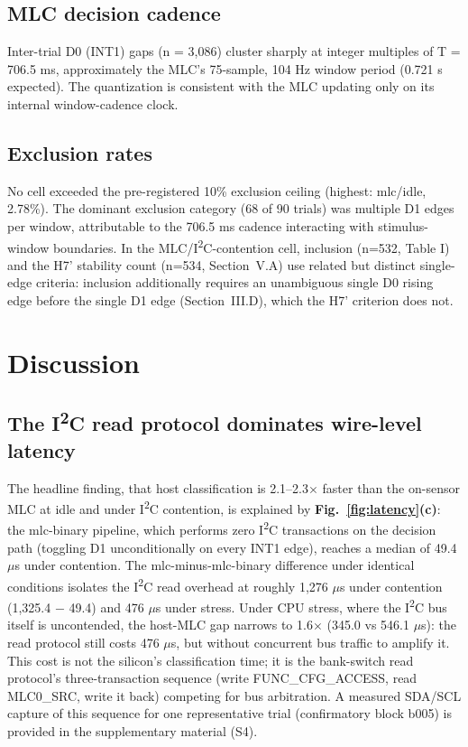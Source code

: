 \subsection{MLC decision cadence}

Inter-trial D0 (INT1) gaps (n = 3,086) cluster sharply at integer multiples of T = 706.5 ms, approximately the MLC's 75-sample, 104 Hz window period (0.721 s expected). The quantization is consistent with the MLC updating only on its internal window-cadence clock.

\subsection{Exclusion rates}

No cell exceeded the pre-registered 10\% exclusion ceiling (highest: mlc/idle, 2.78\%). The dominant exclusion category (68 of 90 trials) was multiple D1 edges per window, attributable to the 706.5 ms cadence interacting with stimulus-window boundaries. In the MLC/I\textsuperscript{2}C-contention cell, inclusion (n=532, Table I) and the H7' stability count (n=534, Section~V.A) use related but distinct single-edge criteria: inclusion additionally requires an unambiguous single D0 rising edge before the single D1 edge (Section~III.D), which the H7' criterion does not.


\section{Discussion}

\subsection{The I\textsuperscript{2}C read protocol dominates wire-level latency}

The headline finding, that host classification is 2.1--2.3$\times$ faster than the on-sensor MLC at idle and under I\textsuperscript{2}C contention, is explained by \textbf{Fig.~\ref{fig:latency}(c)}: the mlc-binary pipeline, which performs zero I\textsuperscript{2}C transactions on the decision path (toggling D1 unconditionally on every INT1 edge), reaches a median of 49.4 $\mu$s under contention. The mlc-minus-mlc-binary difference under identical conditions isolates the I\textsuperscript{2}C read overhead at roughly 1,276 $\mu$s under contention (1,325.4 $-$ 49.4) and 476 $\mu$s under stress. Under CPU stress, where the I\textsuperscript{2}C bus itself is uncontended, the host-MLC gap narrows to 1.6$\times$ (345.0 vs 546.1 $\mu$s): the read protocol still costs 476 $\mu$s, but without concurrent bus traffic to amplify it. This cost is not the silicon's classification time; it is the bank-switch read protocol's three-transaction sequence (write FUNC\_CFG\_ACCESS, read MLC0\_SRC, write it back) competing for bus arbitration. A measured SDA/SCL capture of this sequence for one representative trial (confirmatory block b005) is provided in the supplementary material (S4).

